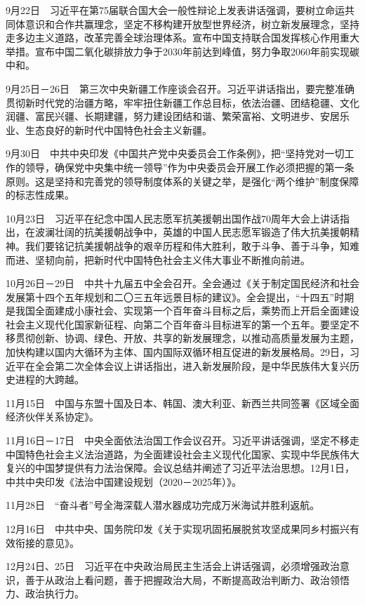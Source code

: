 \documentclass[10pt,a4paper,twocolumn]{book}
\begin{document}
9月22日　习近平在第75届联合国大会一般性辩论上发表讲话强调，要树立命运共同体意识和合作共赢理念，坚定不移构建开放型世界经济，树立新发展理念，坚持走多边主义道路，改革完善全球治理体系。宣布中国支持联合国发挥核心作用重大举措。宣布中国二氧化碳排放力争于2030年前达到峰值，努力争取2060年前实现碳中和。

9月25日－26日　第三次中央新疆工作座谈会召开。习近平讲话指出，要完整准确贯彻新时代党的治疆方略，牢牢扭住新疆工作总目标，依法治疆、团结稳疆、文化润疆、富民兴疆、长期建疆，努力建设团结和谐、繁荣富裕、文明进步、安居乐业、生态良好的新时代中国特色社会主义新疆。

9月30日　中共中央印发《中国共产党中央委员会工作条例》，把“坚持党对一切工作的领导，确保党中央集中统一领导”作为中央委员会开展工作必须把握的第一条原则。这是坚持和完善党的领导制度体系的关键之举，是强化“两个维护”制度保障的标志性成果。

10月23日　习近平在纪念中国人民志愿军抗美援朝出国作战70周年大会上讲话指出，在波澜壮阔的抗美援朝战争中，英雄的中国人民志愿军锻造了伟大抗美援朝精神。我们要铭记抗美援朝战争的艰辛历程和伟大胜利，敢于斗争、善于斗争，知难而进、坚韧向前，把新时代中国特色社会主义伟大事业不断推向前进。

10月26日－29日　中共十九届五中全会召开。全会通过《关于制定国民经济和社会发展第十四个五年规划和二〇三五年远景目标的建议》。全会提出，“十四五”时期是我国全面建成小康社会、实现第一个百年奋斗目标之后，乘势而上开启全面建设社会主义现代化国家新征程、向第二个百年奋斗目标进军的第一个五年。要坚定不移贯彻创新、协调、绿色、开放、共享的新发展理念，以推动高质量发展为主题，加快构建以国内大循环为主体、国内国际双循环相互促进的新发展格局。29日，习近平在全会第二次全体会议上讲话指出，进入新发展阶段，是中华民族伟大复兴历史进程的大跨越。

11月15日　中国与东盟十国及日本、韩国、澳大利亚、新西兰共同签署《区域全面经济伙伴关系协定》。

11月16日－17日　中央全面依法治国工作会议召开。习近平讲话强调，坚定不移走中国特色社会主义法治道路，为全面建设社会主义现代化国家、实现中华民族伟大复兴的中国梦提供有力法治保障。会议总结并阐述了习近平法治思想。12月1日，中共中央印发《法治中国建设规划（2020－2025年）》。

11月28日　“奋斗者”号全海深载人潜水器成功完成万米海试并胜利返航。

12月16日　中共中央、国务院印发《关于实现巩固拓展脱贫攻坚成果同乡村振兴有效衔接的意见》。

12月24日、25日　习近平在中央政治局民主生活会上讲话强调，必须增强政治意识，善于从政治上看问题，善于把握政治大局，不断提高政治判断力、政治领悟力、政治执行力。
\end{document}
